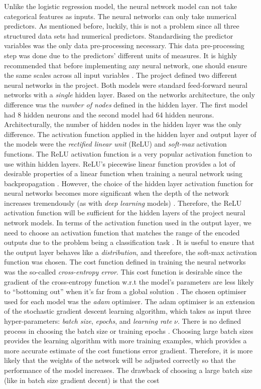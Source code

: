 Unlike the logistic regression model, the neural network model can not take categorical features as inputs. The neural networks can only take numerical predictors. As mentioned before, luckily, this is not a problem since all three structured data sets had numerical predictors. Standardising the predictor variables was the only data pre-processing necessary. This data pre-processing step was done due to the predictors' different units of measures. It is highly recommended that before implementing any neural network, one should ensure the same scales across all input variables \citep*{bishop1995neural}. The project defined two different neural networks in the project. Both models were standard feed-forward neural networks with a \textit{single} hidden layer. Based on the networks architecture, the only difference was the \textit{number of nodes} defined in the hidden layer. The first model had 8 hidden neurons and the second model had 64 hidden neurons. Architecturally, the number of hidden nodes in the hidden layer was the only difference. The activation function applied in the hidden layer and output layer of the models were the \textit{rectified linear unit} (ReLU) and \textit{soft-max} activation functions. The ReLU activation  function is a very popular activation function to use within hidden layers. ReLU's piecewise linear function provides a lot of desirable properties of a linear function when training a neural network using backpropagation \citep*{goodfellow2017deep}. However, the choice of the hidden layer activation function for neural networks becomes more significant when the depth of the network increases tremendously (as with \textit{deep learning} models) \citep{et2020analytics}. Therefore, the ReLU activation function will be sufficient for the hidden layers of the project neural network models. In terms of the activation function used in the output layer, we need to choose an activation function that matches the range of the encoded outputs due to the problem being a classification task \citep{et2020analytics}. It is useful to ensure that the output layer behaves like a \textit{distribution}, and therefore, the soft-max activation function was chosen. The cost function defined in training the neural networks was the so-called \textit{cross-entropy error}. This cost function is desirable since the gradient of the cross-entropy function w.r.t the model's parameters are less likely to ``bottoming out'' when it's far from a global solution \citep{et2020analytics}. The chosen optimiser used for each model was the \textit{adam} optimiser. The adam optimiser is an extension of the stochastic gradient descent learning algorithm, which takes as input three hyper-parameters: \textit{batch size}, \textit{epochs}, and  \textit{learning rate} $\nu$. There is no defined process in choosing the batch size or training epochs \citep{bengio2012practical, masters2018revisiting}. Choosing large batch sizes provides the learning algorithm with more training examples, which provides a more accurate estimate of the cost functions error gradient. Therefore, it is more likely that the weights of the network will be adjusted correctly so that the performance of the model increases. The drawback of choosing a large batch size (like in batch size gradient decent) is that the cost 